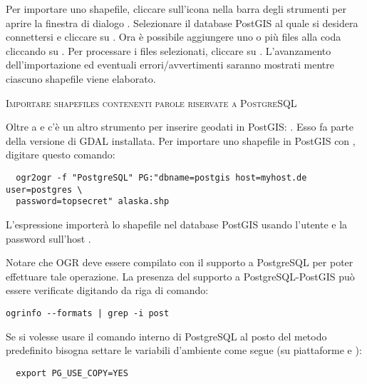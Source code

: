 Per importare uno shapefile, cliccare sull'icona
nella barra degli strumenti per aprire la finestra di
dialogo .
Selezionare il database PostGIS al quale si desidera connettersi
e cliccare su .
Ora è possibile aggiungere uno o più files alla coda
cliccando su . Per processare i files selezionati, cliccare
su . L'avanzamento dell'importazione ed eventuali
errori/avvertimenti saranno mostrati mentre ciascuno shapefile viene
elaborato.
\begin{Tip}\caption{\textsc{Importare shapefiles contenenti parole riservate a PostgreSQL}}
\end{Tip} 

Oltre a  e  c'è un altro strumento per
inserire geodati in PostGIS: . Esso fa parte della versione
di GDAL installata.
Per importare uno shapefile in PostGIS con , digitare questo
comando:
\begin{verbatim}
  ogr2ogr -f "PostgreSQL" PG:"dbname=postgis host=myhost.de user=postgres \
  password=topsecret" alaska.shp
\end{verbatim}

L'espressione importerà lo shapefile  nel database PostGIS
\usertext{postgis}
usando l'utente  e la password  sull'host
\server{myhost.de}.

Notare che OGR deve essere compilato con il supporto a PostgreSQL per poter
effettuare tale operazione.
La presenza del supporto a PostgreSQL-PostGIS può essere verificate digitando
da riga di comando:
\begin{verbatim}
ogrinfo --formats | grep -i post
\end{verbatim}

Se si volesse usare il comando interno di PostgreSQL  al posto
del metodo predefinito \filename{INSERT INTO} bisogna settare le variabili
d'ambiente come segue (su piattaforme \nix e \osx):
\begin{verbatim}
  export PG_USE_COPY=YES
\end{verbatim}

